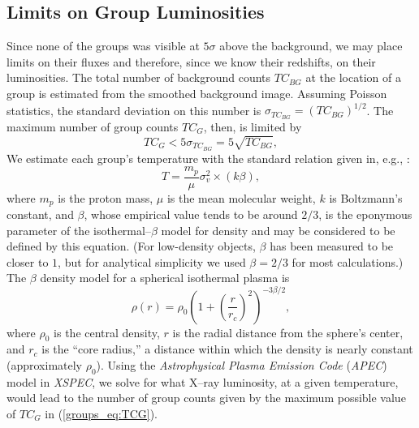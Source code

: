 \subsection{Limits on Group Luminosities}
\label{groups_subsec:limits}
Since none of the groups was visible at $5\sigma$ above the
background, we may place limits on their fluxes and therefore, since
we know their redshifts, on their luminosities.  The total number of
background counts $TC_{BG}$ at the location of a group is estimated
from the smoothed background image.  Assuming Poisson statistics, the
standard deviation on this number is $\sigma_{TC_{BG}} =
(TC_{BG})^{1/2}$.  The maximum number of group counts $TC_G$, then, is
limited by
\begin{equation}
TC_G < 5\sigma_{TC_{BG}} = 5 \sqrt{TC_{BG}},
\label{groups_eq:TCG}
\end{equation}
We estimate each group's temperature with the standard relation given in,
e.g., \citet{mulchaey2000}:
\begin{equation}
T = \frac{m_p}{\mu} \sigma_v^2 \times (k \beta),
\label{groups_eq:temp}
\end{equation}
where $m_p$ is the proton mass, $\mu$ is the mean molecular weight,
$k$ is Boltzmann's constant, and $\beta$, whose empirical value tends
to be around $2/3$, is the eponymous parameter of the
isothermal--$\beta$ model for density and may be considered to be
defined by this equation.  (For low-density objects, $\beta$ has been
measured to be closer to $1$, but for analytical simplicity we used
$\beta=2/3$ for most calculations.)  The $\beta$ density model for a
spherical isothermal plasma is
\begin{equation}
\rho(r) = \rho_0 \left(1 + \left(\frac{r}{r_c}\right)^2\right)^{-3\beta/2},
\label{groups_eq:beta}
\end{equation}
where $\rho_0$ is the central density, $r$ is the radial distance from
the sphere's center, and $r_c$ is the ``core radius,'' a distance
within which the density is nearly constant (approximately $\rho_0$).
Using the \textsl{Astrophysical Plasma Emission Code} (\textsl{APEC})
model in \textsl{XSPEC}, we solve for what X--ray luminosity, at a
given temperature, would lead to the number of group counts given by
the maximum possible value of $TC_G$ in (\ref{groups_eq:TCG}).

